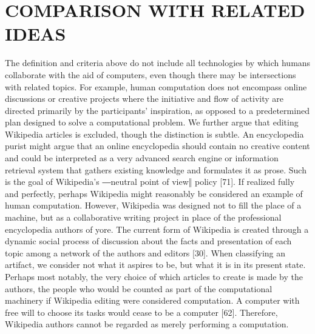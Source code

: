 \documentclass{acm_proc_article-sp} %
\begin{document}
\section{COMPARISON WITH RELATED IDEAS}
 The definition and criteria above do not include all technologies by which humans collaborate with the aid of computers, even though there may be intersections with related topics. For example, human computation does not encompass online discussions or creative projects where the initiative and flow of activity are directed primarily by the participants’ inspiration, as opposed to a predetermined plan designed to solve a computational problem. We further argue that editing Wikipedia articles is excluded, though the distinction is subtle. An encyclopedia purist might argue that an online encyclopedia should contain no creative content and could be interpreted as a very advanced search engine or information retrieval system that gathers existing knowledge and formulates it as prose. Such is the goal of Wikipedia’s ―neutral point of view‖ policy [71]. If realized fully and perfectly, perhaps Wikipedia might reasonably be considered an example of human computation. However, Wikipedia was designed not to fill the place of a machine, but as a collaborative writing project in place of the professional encyclopedia authors of yore. The current form of Wikipedia is created through a dynamic social process of discussion about the facts and presentation of each topic among  a network of the authors and editors [30]. When classifying an artifact, we consider not what it aspires to be, but what it is in its present state.  Perhaps most notably, the very choice of which articles to create is made by the authors, the people who would be counted as part of the computational machinery if Wikipedia editing were considered computation. A computer with free will to choose its tasks would cease to be a computer [62]. Therefore, Wikipedia authors cannot be regarded as merely performing  a computation.
\end{document}
